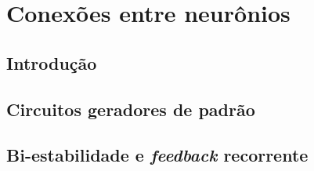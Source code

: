 \chapter{Conexões entre neurônios}\label{cap:conexoes}
\section{Introdução}\label{sec:conexoes_intro}

\section{Circuitos geradores de padrão}\label{sec:geradores}

\section{Bi-estabilidade e \textit{feedback} recorrente}\label{sec:biestabilidade}
